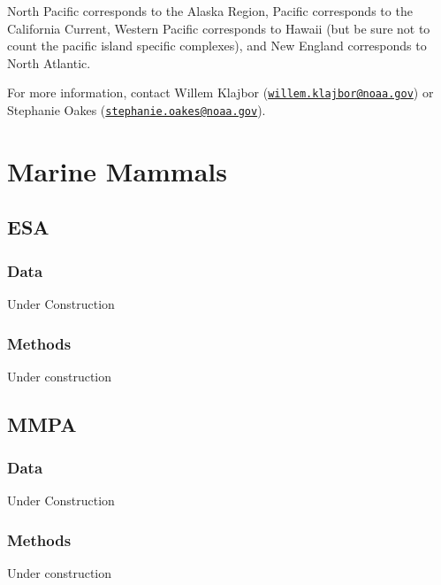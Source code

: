 \documentclass[
]{book}
\begin{document}
North Pacific corresponds to the Alaska Region, Pacific corresponds to the California Current, Western Pacific corresponds to Hawaii (but be sure not to count the pacific island specific complexes), and New England corresponds to North Atlantic.

For more information, contact Willem Klajbor (\href{mailto:willem.klajbor@noaa.gov}{\nolinkurl{willem.klajbor@noaa.gov}}) or Stephanie Oakes (\href{mailto:stephanie.oakes@noaa.gov}{\nolinkurl{stephanie.oakes@noaa.gov}}).

\hypertarget{marine-mammals}{%
\chapter{Marine Mammals}\label{marine-mammals}}

\hypertarget{esa}{%
\section{ESA}\label{esa}}

\hypertarget{data-5}{%
\subsection{Data}\label{data-5}}

Under Construction

\hypertarget{methods-5}{%
\subsection{Methods}\label{methods-5}}

Under construction

\hypertarget{mmpa}{%
\section{MMPA}\label{mmpa}}

\hypertarget{data-6}{%
\subsection{Data}\label{data-6}}

Under Construction

\hypertarget{methods-6}{%
\subsection{Methods}\label{methods-6}}

Under construction
\end{document}
